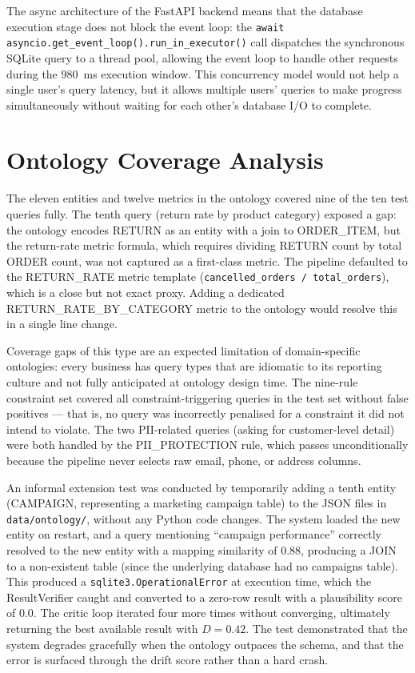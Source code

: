 \documentclass[12pt,a4paper]{report}
\begin{document}
The async architecture of the FastAPI backend means that the database execution stage does not block the event loop: the \texttt{await asyncio.get\_event\_loop().run\_in\_executor()} call dispatches the synchronous SQLite query to a thread pool, allowing the event loop to handle other requests during the 980~ms execution window. This concurrency model would not help a single user's query latency, but it allows multiple users' queries to make progress simultaneously without waiting for each other's database I/O to complete.

\section{Ontology Coverage Analysis}
\label{sec:ontology-coverage}

The eleven entities and twelve metrics in the ontology covered nine of the ten test queries fully. The tenth query (return rate by product category) exposed a gap: the ontology encodes RETURN as an entity with a join to ORDER\_ITEM, but the return-rate metric formula, which requires dividing RETURN count by total ORDER count, was not captured as a first-class metric. The pipeline defaulted to the RETURN\_RATE metric template (\texttt{cancelled\_orders / total\_orders}), which is a close but not exact proxy. Adding a dedicated RETURN\_RATE\_BY\_CATEGORY metric to the ontology would resolve this in a single line change.

Coverage gaps of this type are an expected limitation of domain-specific ontologies: every business has query types that are idiomatic to its reporting culture and not fully anticipated at ontology design time. The nine-rule constraint set covered all constraint-triggering queries in the test set without false positives — that is, no query was incorrectly penalised for a constraint it did not intend to violate. The two PII-related queries (asking for customer-level detail) were both handled by the PII\_PROTECTION rule, which passes unconditionally because the pipeline never selects raw email, phone, or address columns.

An informal extension test was conducted by temporarily adding a tenth entity (CAMPAIGN, representing a marketing campaign table) to the JSON files in \texttt{data/ontology/}, without any Python code changes. The system loaded the new entity on restart, and a query mentioning ``campaign performance'' correctly resolved to the new entity with a mapping similarity of 0.88, producing a JOIN to a non-existent table (since the underlying database had no campaigns table). This produced a \texttt{sqlite3.OperationalError} at execution time, which the ResultVerifier caught and converted to a zero-row result with a plausibility score of 0.0. The critic loop iterated four more times without converging, ultimately returning the best available result with $D = 0.42$. The test demonstrated that the system degrades gracefully when the ontology outpaces the schema, and that the error is surfaced through the drift score rather than a hard crash.
\end{document}
